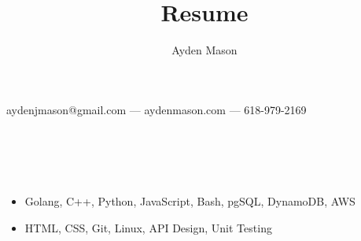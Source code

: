 \documentclass{article}
\makeatletter
\renewcommand{\maketitle}{

\begin{center}
{\huge\bfseries
\theauthor}


aydenjmason@gmail.com --- aydenmason.com --- 618-979-2169
\end{center}
}
\makeatother
\begin{document}
\bgroup\obeylines
\title{Resume}
\author{Ayden Mason}

\maketitle
\color{blue}
\section{\\}
\color{black}
\begin{itemize}
\item Golang, C++, Python, JavaScript, Bash, pgSQL, DynamoDB, AWS
\item HTML, CSS, Git, Linux, API Design, Unit Testing
\end{itemize}
\color{blue}
\end{document}
